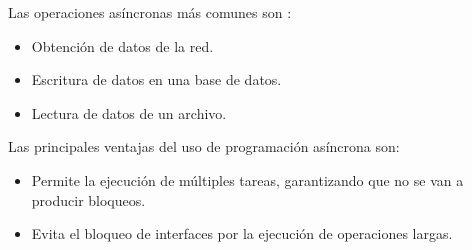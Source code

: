 Las operaciones asíncronas más comunes son \cite{asincrona_dart}:
\begin{itemize}
    \item Obtención de datos de la red.
    \item Escritura de datos en una base de datos.
    \item Lectura de datos de un archivo.
\end{itemize}

Las principales ventajas del uso de programación asíncrona son:
\begin{itemize}
    \item Permite la ejecución de múltiples tareas, garantizando que no se van a producir bloqueos.
    \item Evita el bloqueo de interfaces por la ejecución de operaciones largas.
\end{itemize}

